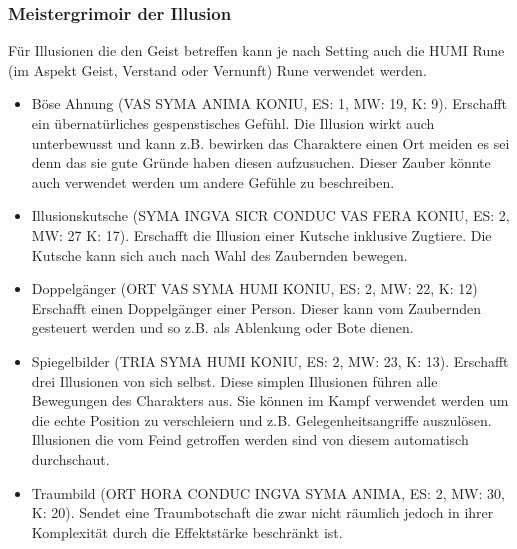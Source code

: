 \documentclass{article}
\begin{document}
\subsubsection{Meistergrimoir der Illusion}

Für Illusionen die den Geist betreffen kann je nach Setting auch die HUMI Rune (im Aspekt Geist, Verstand oder
Vernunft) Rune verwendet werden.

\begin{itemize}
\item Böse Ahnung (VAS SYMA ANIMA KONIU, ES: 1, MW: 19, K: 9). Erschafft ein übernatürliches gespenstisches Gefühl. Die Illusion wirkt auch unterbewusst und kann z.B. bewirken das Charaktere einen Ort meiden es sei denn das sie gute Gründe haben diesen aufzusuchen. Dieser Zauber könnte auch verwendet werden um andere Gefühle zu beschreiben.
\end{itemize}

\begin{itemize}
\item Illusionskutsche (SYMA INGVA SICR CONDUC VAS FERA KONIU, ES: 2, MW: 27 K: 17). Erschafft die Illusion einer Kutsche inklusive Zugtiere. Die Kutsche kann sich auch nach Wahl des Zaubernden bewegen.
\end{itemize}

\begin{itemize}
\item Doppelgänger (ORT VAS SYMA HUMI KONIU, ES: 2, MW: 22, K: 12) Erschafft einen Doppelgänger einer Person. Dieser kann vom Zaubernden gesteuert werden und so z.B. als Ablenkung oder Bote dienen.
\end{itemize}

\begin{itemize}
\item Spiegelbilder (TRIA SYMA HUMI KONIU, ES: 2, MW: 23, K: 13). Erschafft drei Illusionen von sich selbst. Diese simplen Illusionen führen alle Bewegungen des Charakters aus. Sie können im Kampf verwendet werden um die echte Position zu verschleiern und z.B. Gelegenheitsangriffe auszulösen. Illusionen die vom Feind getroffen werden sind von diesem automatisch durchschaut.
\end{itemize}

\begin{itemize}
\item Traumbild (ORT HORA CONDUC INGVA SYMA ANIMA, ES: 2, MW: 30, K: 20). Sendet eine Traumbotschaft die zwar nicht räumlich jedoch in ihrer Komplexität durch die Effektstärke beschränkt ist.
\end{itemize}
\end{document}
